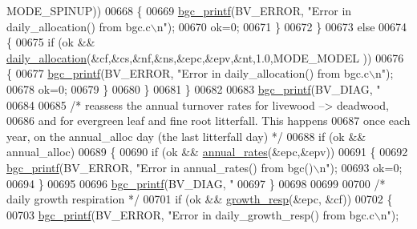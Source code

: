 \begin{DoxyCode}
{{{{{{{{{{{{{{{{{{{      MODE\_SPINUP))
00668                     \{
00669                         \hyperlink{bgc__io_8c_af287cce6e2aede1ce337de9319e80d0d}{bgc\_printf}(BV\_ERROR, \textcolor{stringliteral}{"Error in daily\_allocation() from bgc.c\(\backslash\)n"});
00670                         ok=0;
00671                     \}
00672                 \}
00673                 \textcolor{keywordflow}{else}
00674                 \{
00675                     \textcolor{keywordflow}{if} (ok && \hyperlink{daily__allocation_8c_a78494a491616be3574480363952f005f}{daily\_allocation}(&cf,&cs,&nf,&ns,&epc,&epv,&nt,1.0,MODE\_MODEL
      ))
00676                     \{
00677                         \hyperlink{bgc__io_8c_af287cce6e2aede1ce337de9319e80d0d}{bgc\_printf}(BV\_ERROR, \textcolor{stringliteral}{"Error in daily\_allocation() from bgc.c\(\backslash\)n"});
00678                         ok=0;
00679                     \}
00680                 \}
00681             \}
00682             
00683             \hyperlink{bgc__io_8c_af287cce6e2aede1ce337de9319e80d0d}{bgc\_printf}(BV\_DIAG, \textcolor{stringliteral}{"%
00684 
00685             \textcolor{comment}{/* reassess the annual turnover rates for livewood --> deadwood,}
00686 \textcolor{comment}{            and for evergreen leaf and fine root litterfall. This happens}
00687 \textcolor{comment}{            once each year, on the annual\_alloc day (the last litterfall day) */}
00688             \textcolor{keywordflow}{if} (ok && annual\_alloc)
00689             \{
00690                 \textcolor{keywordflow}{if} (ok && \hyperlink{annual__rates_8c_a31da74671128c782a97dbd8952ded454}{annual\_rates}(&epc,&epv))
00691                 \{
00692                     \hyperlink{bgc__io_8c_af287cce6e2aede1ce337de9319e80d0d}{bgc\_printf}(BV\_ERROR, \textcolor{stringliteral}{"Error in annual\_rates() from bgc()\(\backslash\)n"});
00693                     ok=0;
00694                 \}
00695                 
00696                 \hyperlink{bgc__io_8c_af287cce6e2aede1ce337de9319e80d0d}{bgc\_printf}(BV\_DIAG, \textcolor{stringliteral}{"%
00697             \} 
00698 
00699 
00700             \textcolor{comment}{/* daily growth respiration */}
00701             \textcolor{keywordflow}{if} (ok && \hyperlink{growth__resp_8c_a85d965990cd0096b29def19816e47e62}{growth\_resp}(&epc, &cf))
00702             \{
00703                 \hyperlink{bgc__io_8c_af287cce6e2aede1ce337de9319e80d0d}{bgc\_printf}(BV\_ERROR, \textcolor{stringliteral}{"Error in daily\_growth\_resp() from bgc.c\(\backslash\)n"});
}}}}}}}}}}}}}}}}}}}}}
\end{DoxyCode}
